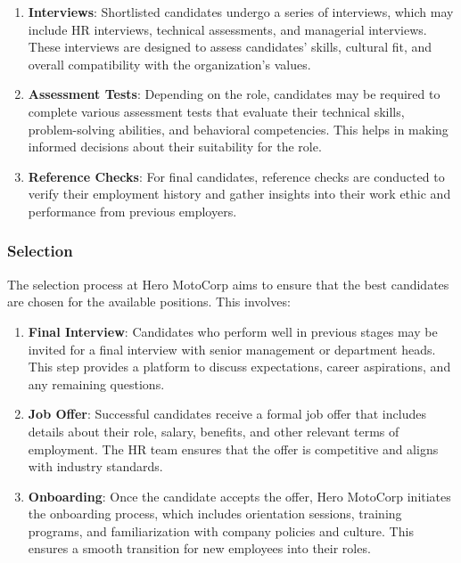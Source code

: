 \begin{enumerate}
	\item \textbf{Interviews}: Shortlisted candidates undergo a series of interviews, which may include HR interviews, technical assessments, and managerial interviews. These interviews are designed to assess candidates' skills, cultural fit, and overall compatibility with the organization's values.

	\item \textbf{Assessment Tests}: Depending on the role, candidates may be required to complete various assessment tests that evaluate their technical skills, problem-solving abilities, and behavioral competencies. This helps in making informed decisions about their suitability for the role.

	\item \textbf{Reference Checks}: For final candidates, reference checks are conducted to verify their employment history and gather insights into their work ethic and performance from previous employers.
\end{enumerate}

\subsubsection{Selection}
The selection process at Hero MotoCorp aims to ensure that the best candidates are chosen for the available positions. This involves:

\begin{enumerate}
	\item \textbf{Final Interview}: Candidates who perform well in previous stages may be invited for a final interview with senior management or department heads. This step provides a platform to discuss expectations, career aspirations, and any remaining questions.

	\item \textbf{Job Offer}: Successful candidates receive a formal job offer that includes details about their role, salary, benefits, and other relevant terms of employment. The HR team ensures that the offer is competitive and aligns with industry standards.

	\item \textbf{Onboarding}: Once the candidate accepts the offer, Hero MotoCorp initiates the onboarding process, which includes orientation sessions, training programs, and familiarization with company policies and culture. This ensures a smooth transition for new employees into their roles.
\end{enumerate}

